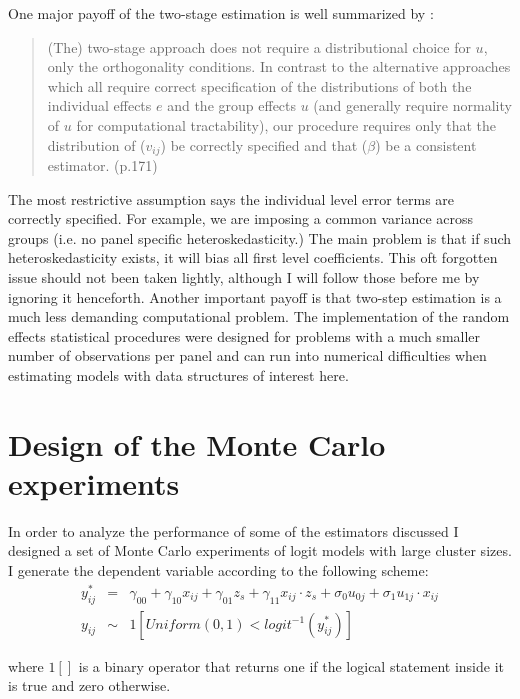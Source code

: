 One major payoff of the two-stage estimation is well summarized by \citeauthor{borjas:1994}:

\begin{quotation}
  (The) two-stage approach does not require a distributional choice for $u$, only the orthogonality conditions. In contrast to the alternative approaches which all require correct specification of the distributions of both the individual effects $e$ and the group effects $u$ (and generally require normality of $u$ for computational tractability), our procedure requires only that the distribution of ($v_{ij}$) be correctly specified and that ($\beta$) be a consistent estimator.  (p.171)
\end{quotation}

The most restrictive assumption says the individual level error terms are correctly specified. For example, we are imposing a common variance across groups (i.e. no panel specific heteroskedasticity.) The main problem is that if such heteroskedasticity exists, it will bias all first level coefficients. This oft forgotten issue should not been taken lightly, although I will follow those before me by ignoring it henceforth. Another important payoff is that two-step estimation is a much less demanding computational problem. The implementation of the random effects statistical procedures were designed for problems with a much smaller number of observations per panel and can run into numerical difficulties when estimating models with data structures of interest here.\citep{Primo:2007}

\section{Design of the Monte Carlo experiments}

In order to analyze the performance of some of the estimators discussed I designed a set of Monte Carlo experiments of logit models with large cluster sizes. I generate the dependent variable according to the following scheme:
\begin{eqnarray}
  \label{eq:dgp}
  y^*_{ij}&=&\gamma_{00}+\gamma_{10} x_{ij}+\gamma_{01} z_s+\gamma_{11} x_{ij}
  \cdot z_s+\sigma_0u_{0j}+\sigma_1u_{1j}\cdot x_{ij} \\
  y_{ij}&\sim&1\left[Uniform(0,1)<logit^{-1}(y^*_{ij})\right]
\end{eqnarray}

where $1[]$ is a binary operator that returns one if the logical statement inside it is true and zero otherwise.


